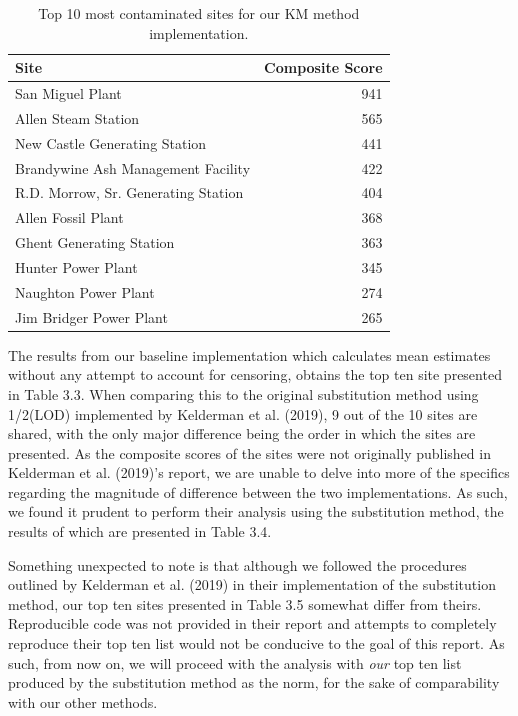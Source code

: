 \documentclass[12pt, twoside]{amherstthesis}
\begin{document}
\begin{table}

\caption{\label{tab:unnamed-chunk-12}Top 10 most contaminated sites 
             for our KM method implementation.}
\centering
\fontsize{11.5}{13.5}\selectfont
\begin{tabular}[t]{lr}
\toprule
Site & Composite Score\\
\midrule
San Miguel Plant & 941\\
\addlinespace
Allen Steam Station & 565\\
\addlinespace
New Castle Generating Station & 441\\
\addlinespace
Brandywine Ash Management Facility & 422\\
\addlinespace
R.D. Morrow, Sr. Generating Station & 404\\
\addlinespace
Allen Fossil Plant & 368\\
\addlinespace
Ghent Generating Station & 363\\
\addlinespace
Hunter Power Plant & 345\\
\addlinespace
Naughton Power Plant & 274\\
\addlinespace
Jim Bridger Power Plant & 265\\
\bottomrule
\end{tabular}
\end{table}
The results from our baseline implementation which calculates mean estimates without any attempt to account for censoring, obtains the top ten site presented in Table 3.3. When comparing this to the original substitution method using 1/2(LOD) implemented by Kelderman et al. (2019), 9 out of the 10 sites are shared, with the only major difference being the order in which the sites are presented. As the composite scores of the sites were not originally published in Kelderman et al. (2019)'s report, we are unable to delve into more of the specifics regarding the magnitude of difference between the two implementations. As such, we found it prudent to perform their analysis using the substitution method, the results of which are presented in Table 3.4.

Something unexpected to note is that although we followed the procedures outlined by Kelderman et al. (2019) in their implementation of the substitution method, our top ten sites presented in Table 3.5 somewhat differ from theirs. Reproducible code was not provided in their report and attempts to completely reproduce their top ten list would not be conducive to the goal of this report. As such, from now on, we will proceed with the analysis with \emph{our} top ten list produced by the substitution method as the norm, for the sake of comparability with our other methods.
\end{document}
